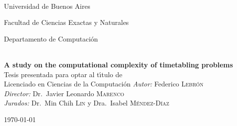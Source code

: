 \begin{titlepage}

\begin{center}


\begin{flushleft}
%
\hfill
{}\\[2.0cm]
\end{flushleft}

{\large \sc Universidad de Buenos Aires

Facultad de Ciencias Exactas y Naturales

Departamento de Computaci\'on} \\[2cm]

{ \LARGE \bfseries A study on the computational complexity of timetabling problems}\\[2.6cm]
{\large Tesis presentada para optar al t\'{\i}tulo de\\
Licenciado en Ciencias de la Computaci\'on}
\vfill
{\large \emph{Autor:} Federico \textsc{Lebrón}\\[0.5cm]
\emph{Director:} 
Dr.~Javier Leonardo \textsc{Marenco} \\[0.5cm]
\emph{Jurados:} 
Dr.~Min Chih \textsc{Lin} y 
Dra.~Isabel \textsc{Méndez-Díaz}
}
\vfill

{\large \today}

\end{center}
\end{titlepage}
